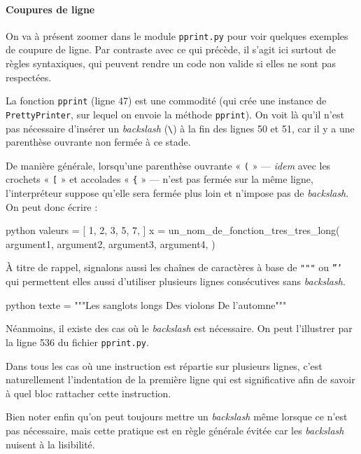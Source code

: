 \paragraph*{Coupures de ligne}
On va à présent zoomer dans le module \texttt{pprint.py} pour voir quelques exemples de coupure de ligne. Par con\-traste avec ce qui précède, il s'agit ici surtout de règles syntaxiques, qui peuvent rendre un code non valide si elles ne sont pas respectées.

La fonction \texttt{pprint} (ligne 47) est une commodité (qui crée une instance de \texttt{PrettyPrinter}, sur lequel on envoie la méthode \texttt{pprint}). On voit là qu'il n'est pas nécessaire d'insérer un \textit{backslash} (\texttt{\textbackslash}) à la fin des lignes 50 et 51, car il y a une parenthèse ouvrante non fermée à ce stade.

De manière générale, lorsqu'une parenthèse ouvrante « \texttt{(} » --- \textit{idem} avec les crochets « \texttt{[} » et accolades « \texttt{\{} » --- n'est pas fermée sur la même ligne, l'interpréteur suppose qu'elle sera fermée plus loin et n'impose pas de \textit{backslash}.
On peut donc écrire :

\vspace{-2pt}
\begin{codebox}{python}
valeurs = [ 
   1,
   2,
   3,
   5,
   7,
]
x = un_nom_de_fonction_tres_tres_long(
       argument1, argument2,
       argument3, argument4,
    )
\end{codebox}

À titre de rappel, signalons aussi les chaînes de caractères à base de \texttt{"""} ou \texttt{'''} qui permettent elles aussi d'utiliser plusieurs lignes consécutives sans \textit{backslash}.

\vspace{-2pt}
\begin{codebox}{python}
texte = """Les sanglots longs
Des violons
De l'automne"""
\end{codebox}

Néanmoins, il existe des cas où le \textit{backslash} est nécessaire. On peut l'illustrer par la ligne 536 du fichier \texttt{pprint.py}.

Dans tous les cas où une instruction est répartie sur plusieurs lignes, c'est naturellement l'indentation de la première ligne qui est significative afin de savoir à quel bloc rattacher cette instruction.

Bien noter enfin qu'on peut toujours mettre un \textit{backslash} même lorsque ce n'est pas nécessaire, mais cette pratique est en règle générale évitée car les \textit{backslash} nuisent à la lisibilité.

